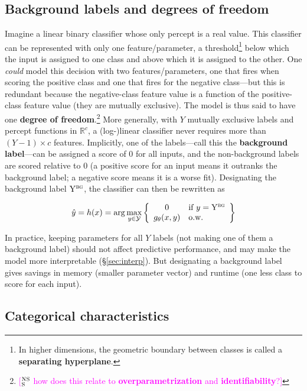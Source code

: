 \documentclass[11pt,letterpaper]{article}
\newcommand{\ensuretext}[1]{#1}
\newcommand{\nssmarker}{\ensuretext{\textcolor{magenta}{\ensuremath{^{\textsc{NS}}_{\textsc{S}}}}}}
\newcommand{\arkcomment}[3]{\ensuretext{\textcolor{#3}{[#1 #2]}}}
\newcommand{\nss}[1]{\arkcomment{\nssmarker}{#1}{magenta}}
\newcommand{\params}{\mathbf{\theta}}
\newcommand{\Sref}[1]{\S\ref{#1}}
\begin{document}
\subsection{Background labels and degrees of freedom}\label{sec:bg}

Imagine a linear binary classifier whose only percept is a real value. 
This classifier can be represented with only one feature/parameter, a threshold\footnote{In higher dimensions, the geometric boundary between classes is called a {\bf separating hyperplane}.}
below which the input is assigned to one class and above which it is assigned to the other.
One {\em could} model this decision with two features/parameters, one that fires when scoring the positive class 
and one that fires for the negative class---but this is redundant because the negative-class feature value
is a function of the positive-class feature value (they are mutually exclusive).
The model is thus said to have one {\bf degree of freedom}.\footnote{\nss{how does this relate to {\bf overparametrization} and {\bf identifiability}?}}
More generally, with $Y$ mutually exclusive labels and percept functions in $\mathbb{R}^c$, a (log-)linear classifier 
never requires more than $(Y-1) \times c$ features. 
Implicitly, one of the labels---call this the {\bf background label}---can be assigned a score of 0 for all inputs, 
and the non-background labels are scored relative to 0 (a positive score for an input means it outranks the background label; 
a negative score means it is a worse fit). Designating the background label $\mathrm{Y}^{\textsc{bg}}$, the classifier can then be rewritten as

\begin{equation}\label{eq:classifier-bg}
\hat{y} = h(x) = \arg\max_{y\in\mathcal{Y}} \left\{\begin{array}{cl}
0 & \text{if }y=\mathrm{Y}^{\textsc{bg}} \\
g_\params(x,y) & \text{o.w.}\end{array}\right\}
\end{equation}

In practice, keeping parameters for all $Y$ labels (not making one of them a background label) 
should not affect predictive performance, and may make the model more interpretable (\Sref{sec:interp}).
But designating a background label gives savings in memory (smaller parameter vector) and runtime (one less class to score for each input).

\subsection{Categorical characteristics}
\end{document}
